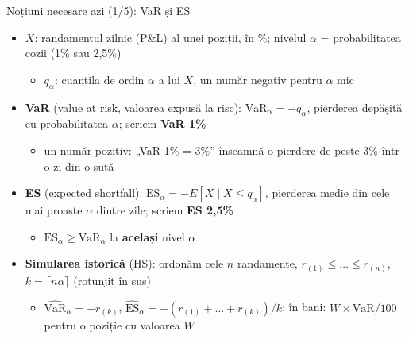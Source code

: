 \begin{frame}{Noțiuni necesare azi (1/5): VaR și ES}
\itemsize{\small}
\begin{itemize}
    \item $X$: randamentul zilnic (P\&L) al unei poziții, în \%; nivelul $\alpha$ = probabilitatea cozii (1\% sau 2,5\%)
    \begin{itemize}
        \item $q_\alpha$: cuantila de ordin $\alpha$ a lui $X$, un număr negativ pentru $\alpha$ mic
    \end{itemize}
    \item \textbf{VaR} (value at risk, valoarea expusă la risc): $\mathrm{VaR}_\alpha = -q_\alpha$, pierderea depășită cu probabilitatea $\alpha$; scriem \textbf{VaR 1\%}
    \begin{itemize}
        \item un număr pozitiv: „VaR 1\% = 3\%” înseamnă o pierdere de peste 3\% într-o zi din o sută
    \end{itemize}
    \item \textbf{ES} (expected shortfall): $\mathrm{ES}_\alpha = -E[X \mid X \le q_\alpha]$, pierderea medie din cele mai proaste $\alpha$ dintre zile; scriem \textbf{ES 2,5\%}
    \begin{itemize}
        \item $\mathrm{ES}_\alpha \ge \mathrm{VaR}_\alpha$ la \textbf{același} nivel $\alpha$
    \end{itemize}
    \item \textbf{Simularea istorică} (HS): ordonăm cele $n$ randamente, $r_{(1)} \le \dots \le r_{(n)}$, $k = \lceil n\alpha \rceil$ (rotunjit în sus)
    \begin{itemize}
        \item $\widehat{\mathrm{VaR}}_\alpha = -r_{(k)}$, \quad $\widehat{\mathrm{ES}}_\alpha = -(r_{(1)} + \dots + r_{(k)})/k$; în bani: $W \times \mathrm{VaR}/100$ pentru o poziție cu valoarea $W$
    \end{itemize}
\end{itemize}
\end{frame}

